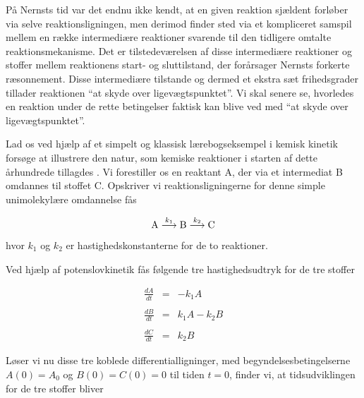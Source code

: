 \vspace{4.0mm}
P{\aa} Nernsts tid var det endnu ikke kendt, at en given
reaktion sj{\ae}ldent forl{\o}ber via selve
reaktions\-lig\-ningen, men derimod finder sted via et
kompliceret samspil mellem en r{\ae}kke intermedi{\ae}re
reaktioner svarende til den tidligere omtalte
reaktions\-mekanisme. Det er tilstedev{\ae}relsen af disse
intermedi{\ae}re reaktioner og stoffer mellem reaktionens
start- og sluttilstand, der for{\aa}rsager Nernsts forkerte
r{\ae}sonnement. Disse intermedi{\ae}re tilstande og dermed
et ekstra s{\ae}t frihedsgrader tillader reaktionen ``at
skyde over ligev{\ae}gts\-punktet''. Vi skal senere se,
hvorledes en reaktion under de rette betingelser faktisk
kan blive ved med ``at skyde over ligev{\ae}gts\-punktet''.

\vspace{4.0mm}
Lad os ved hj{\ae}lp af et simpelt og klassisk
l{\ae}rebogseksempel i kemisk kinetik fors{\o}ge at
illustrere den natur, som kemiske reaktioner i starten af
dette {\aa}rhundrede tillagdes \cite[s.\ 690]{Alberty}. Vi
forestiller os en reaktant A, der via et intermediat B
omdannes til stoffet C. Opskriver vi
reaktions\-lig\-ningerne for denne simple unimolekyl{\ae}re
omdannelse f{\aa}s

\begin{equation}
  {\rm A} \stackrel{k_1}{\longrightarrow}
  {\rm B} \stackrel{k_2}{\longrightarrow} 
  {\rm C}
  \label{eq:Unimolecular}
\end{equation}

hvor $k_1$ og $k_2$ er hastigheds\-konstanterne for de to
reaktioner. 

\newpage
Ved hj{\ae}lp af potenslov\-kinetik f{\aa}s
f{\o}lgende tre hastigheds\-udtryk for de tre stoffer

\begin{eqnarray}
  \frac{dA}{dt} & = & - k_1 A       \nonumber\\
                &   &               \nonumber\\
  \frac{dB}{dt} & = & k_1 A - k_2 B          \\
                &   &               \nonumber\\
  \frac{dC}{dt} & = & k_2 B         \nonumber
  \label{eq:DerivativeABC}
\end{eqnarray}

L{\o}ser vi nu disse tre koblede differentiallig\-ninger, med
begyndelsesbeting\-el\-ser\-ne $A(0) = A_0$ og $B(0) = C(0) = 0$
til tiden $t=0$, finder vi, at tidsudviklingen for de tre
stoffer bliver


